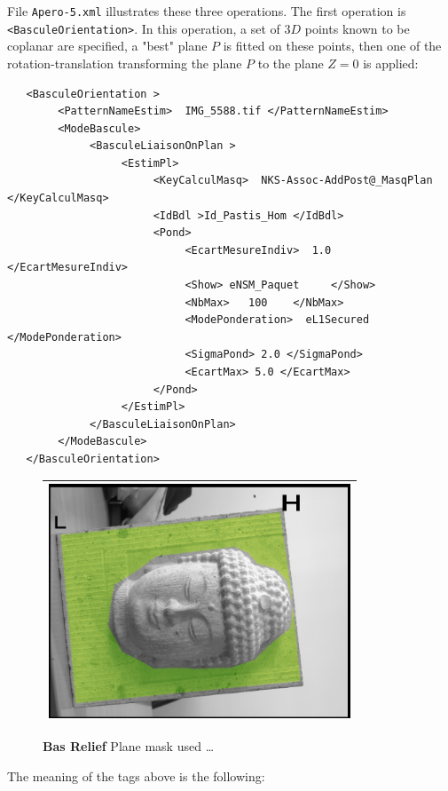 File {\tt Apero-5.xml} illustrates these three operations. 
The first operation is {\tt <BasculeOrientation>}.
In this operation, a set of $3D$ points known to be coplanar are specified,
a "best" plane $P$ is fitted on these points, then one of the  rotation-translation 
transforming the plane $P$ to the plane $Z=0$ is applied:


{\scriptsize
\begin{verbatim}
   <BasculeOrientation >
        <PatternNameEstim>  IMG_5588.tif </PatternNameEstim>
        <ModeBascule>
             <BasculeLiaisonOnPlan >
                  <EstimPl>
                       <KeyCalculMasq>  NKS-Assoc-AddPost@_MasqPlan </KeyCalculMasq>
                       <IdBdl >Id_Pastis_Hom </IdBdl>
                       <Pond>
                            <EcartMesureIndiv>  1.0 </EcartMesureIndiv>
                            <Show> eNSM_Paquet     </Show>
                            <NbMax>   100    </NbMax>
                            <ModePonderation>  eL1Secured </ModePonderation>
                            <SigmaPond> 2.0 </SigmaPond>
                            <EcartMax> 5.0 </EcartMax>
                       </Pond>
                  </EstimPl>
             </BasculeLiaisonOnPlan>
        </ModeBascule>
   </BasculeOrientation>
\end{verbatim}
}


\begin{figure}
\begin{tabular}{||c||}
   \hline \hline
   \includegraphics[width=90mm]{FIGS/Boudhas/Masq-Plan-Boudha-Annoted.jpg} \\ \hline  \hline
\end{tabular}
\caption{{\bf Bas Relief} Plane mask used  \dots}
\end{figure}


The meaning of the tags above is the following:

